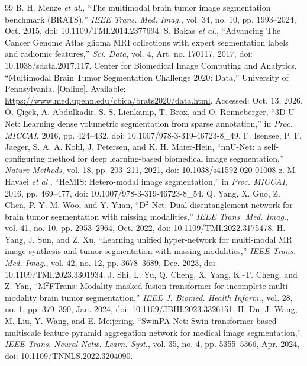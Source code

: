 \documentclass[conference]{IEEEtran}
\begin{document}
\begin{thebibliography}{99}
 B. H. Menze \emph{et al.}, ``The multimodal brain tumor image segmentation benchmark (BRATS),'' \emph{IEEE Trans. Med. Imag.}, vol. 34, no. 10, pp. 1993--2024, Oct. 2015, doi: 10.1109/TMI.2014.2377694.
 S. Bakas \emph{et al.}, ``Advancing The Cancer Genome Atlas glioma MRI collections with expert segmentation labels and radiomic features,'' \emph{Sci. Data}, vol. 4, Art. no. 170117, 2017, doi: 10.1038/sdata.2017.117.
 Center for Biomedical Image Computing and Analytics, ``Multimodal Brain Tumor Segmentation Challenge 2020: Data,'' University of Pennsylvania. [Online]. Available: \url{https://www.med.upenn.edu/cbica/brats2020/data.html}. Accessed: Oct. 13, 2026.
 \"O. \c{C}i\c{c}ek, A. Abdulkadir, S. S. Lienkamp, T. Brox, and O. Ronneberger, ``3D U-Net: Learning dense volumetric segmentation from sparse annotation,'' in \emph{Proc. MICCAI}, 2016, pp. 424--432, doi: 10.1007/978-3-319-46723-8\_49.
 F. Isensee, P. F. Jaeger, S. A. A. Kohl, J. Petersen, and K. H. Maier-Hein, ``nnU-Net: a self-configuring method for deep learning-based biomedical image segmentation,'' \emph{Nature Methods}, vol. 18, pp. 203--211, 2021, doi: 10.1038/s41592-020-01008-z.
 M. Havaei \emph{et al.}, ``HeMIS: Hetero-modal image segmentation,'' in \emph{Proc. MICCAI}, 2016, pp. 469--477, doi: 10.1007/978-3-319-46723-8\_54.
 Q. Yang, X. Guo, Z. Chen, P. Y. M. Woo, and Y. Yuan, ``D$^2$-Net: Dual disentanglement network for brain tumor segmentation with missing modalities,'' \emph{IEEE Trans. Med. Imag.}, vol. 41, no. 10, pp. 2953--2964, Oct. 2022, doi: 10.1109/TMI.2022.3175478.
 H. Yang, J. Sun, and Z. Xu, ``Learning unified hyper-network for multi-modal MR image synthesis and tumor segmentation with missing modalities,'' \emph{IEEE Trans. Med. Imag.}, vol. 42, no. 12, pp. 3678--3689, Dec. 2023, doi: 10.1109/TMI.2023.3301934.
 J. Shi, L. Yu, Q. Cheng, X. Yang, K.-T. Cheng, and Z. Yan, ``M$^2$FTrans: Modality-masked fusion transformer for incomplete multi-modality brain tumor segmentation,'' \emph{IEEE J. Biomed. Health Inform.}, vol. 28, no. 1, pp. 379--390, Jan. 2024, doi: 10.1109/JBHI.2023.3326151.
 H. Du, J. Wang, M. Liu, Y. Wang, and E. Meijering, ``SwinPA-Net: Swin transformer-based multiscale feature pyramid aggregation network for medical image segmentation,'' \emph{IEEE Trans. Neural Netw. Learn. Syst.}, vol. 35, no. 4, pp. 5355--5366, Apr. 2024, doi: 10.1109/TNNLS.2022.3204090.

\end{thebibliography}
\end{document}
